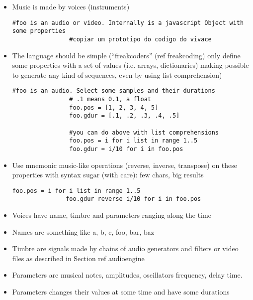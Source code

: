\documentclass[letterpaper, 12pt]{article}
\begin{document}
\begin{itemize}
\item Music is made by voices (instruments)
            \begin{Verbatim}[fontfamily=courier, xleftmargin=\parindent]
                #foo is an audio or video. Internally is a javascript Object with some properties
                #copiar um prototipo do codigo do vivace
            \end{Verbatim}
\item The language should be simple (``freakcoders'' (ref freakcoding) only define some properties with a set of values (i.e. arrays, dictionaries) making possible to generate any kind of sequences, even by using list comprehension)
            \begin{Verbatim}[fontfamily=courier, xleftmargin=\parindent]
                #foo is an audio. Select some samples and their durations
                # .1 means 0.1, a float
                foo.pos = [1, 2, 3, 4, 5]
                foo.gdur = [.1, .2, .3, .4, .5]
                
                #you can do above with list comprehensions
                foo.pos = i for i list in range 1..5
                foo.gdur = i/10 for i in foo.pos
            \end{Verbatim}
            
\item Use mnemonic music-like operations (reverse, inverse, transpose) on these properties with syntax sugar (with care): few chars, big results
            \begin{Verbatim}[fontfamily=courier, xleftmargin=\parindent]
               foo.pos = i for i list in range 1..5
               foo.gdur reverse i/10 for i in foo.pos
            \end{Verbatim}
            
\item Voices have name, timbre and parameters ranging along the time
\item Names are something like a, b, c, foo, bar, baz
\item Timbre are signals made by chains of audio generators and filters or video files as described in Section ref audioengine
\item Parameters are musical notes, amplitudes, oscillators frequency, delay time.
\item Parameters changes their values at some time and have some durations

\end{itemize}
\end{document}
